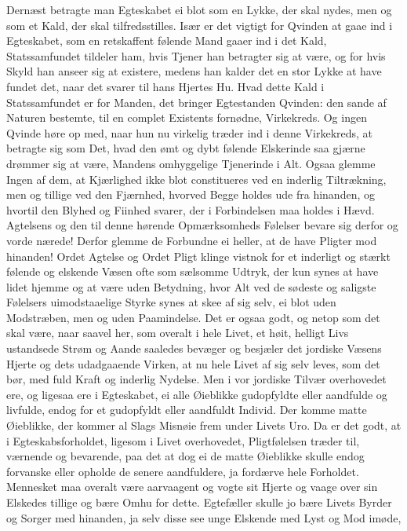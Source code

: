 \documentclass[12pt,a4paper]{book}
\newcommand{\apage}[1]{\marginnote{\footnotesize\textit{[#1]}}}
\begin{document}
Dernæst betragte man Egteskabet ei blot som en Lykke, der skal nydes,
men og som et Kald, der skal tilfredsstilles. Især er det vigtigt for
Qvinden at gaae ind i Egteskabet, som en retskaffent følende Mand gaaer
ind i det Kald, Statssamfundet tildeler ham, hvis Tjener han betragter
sig at være, og for hvis Skyld han anseer sig at existere, medens han
kalder det en stor Lykke at have fundet det, naar det svarer til hans
Hjertes Hu. Hvad dette Kald i Statssamfundet er for Manden, det bringer
Egtestanden Qvinden: den sande af Naturen bestemte, til en complet
Existents fornødne, Virkekreds. Og ingen Qvinde høre op med, naar hun nu
virkelig træder ind i denne Virkekreds, at betragte sig som Det, hvad
den ømt og dybt følende Elskerinde saa gjærne drømmer sig at være,
Mandens omhyggelige Tjenerinde i Alt. Ogsaa glemme Ingen af dem, at
Kjærlighed ikke blot constitueres ved en inderlig Tiltrækning, men og
tillige ved den Fjærnhed, \apage{96} hvorved Begge holdes ude fra hinanden, og
hvortil den Blyhed og Fiinhed svarer, der i Forbindelsen maa holdes i
Hævd. Agtelsens og den til denne hørende Opmærksomheds Følelser bevare
sig derfor og vorde nærede! Derfor glemme de Forbundne ei heller, at de
have Pligter mod hinanden! Ordet Agtelse og Ordet Pligt klinge vistnok
for et inderligt og stærkt følende og elskende Væsen ofte som sælsomme
Udtryk, der kun synes at have lidet hjemme og at være uden Betydning,
hvor Alt ved de sødeste og saligste Følelsers uimodstaaelige Styrke
synes at skee af sig selv, ei blot uden Modstræben, men og uden
Paamindelse. Det er ogsaa godt, og netop som det skal være, naar saavel
her, som overalt i hele Livet, et høit, helligt Livs ustandsede Strøm og
Aande saaledes bevæger og besjæler det jordiske Væsens Hjerte og dets
udadgaaende Virken, at nu hele Livet af sig selv leves, som det bør, med
fuld Kraft og inderlig Nydelse. Men i vor jordiske Tilvær overhovedet
ere, og ligesaa ere i Egteskabet, ei alle Øieblikke gudopfyldte eller
aandfulde og livfulde, endog for et gudopfyldt eller aandfuldt Individ.
Der komme matte Øieblikke, der kommer al Slags Misnøie frem under Livets
Uro. Da er det godt, at i Egteskabsforholdet, ligesom i Livet
overhovedet, Pligtfølelsen træder til, værnende og bevarende, paa det at
dog ei de matte Øieblikke skulle endog forvanske eller opholde de senere
aandfuldere, ja fordærve hele Forholdet. Mennesket maa overalt være
aarvaagent og vogte sit Hjerte \apage{97} og vaage over sin Elskedes tillige og
bære Omhu for dette. Egtefæller skulle jo bære Livets Byrder og Sorger
med hinanden, ja selv disse see unge Elskende med Lyst og Mod imøde,
\end{document}
